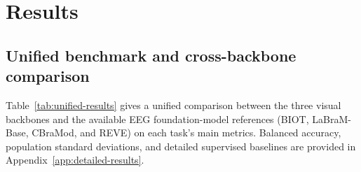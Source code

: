 \section{Results}
\label{sec:results}

\subsection{Unified benchmark and cross-backbone comparison}

Table~\ref{tab:unified-results} gives a unified
comparison between the three visual backbones and the available EEG
foundation-model references (BIOT, LaBraM-Base, CBraMod, and REVE) on each
task's main metrics. Balanced
accuracy, population standard deviations, and detailed supervised baselines
are provided in Appendix~\ref{app:detailed-results}.

